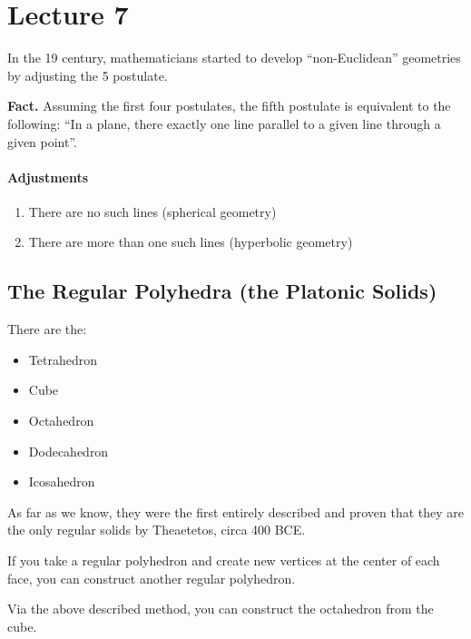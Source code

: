 \documentclass[class=article, crop=false]{standalone}
\begin{document}
  \section{Lecture 7}
  In the 19 century, mathematicians started to develop ``non-Euclidean'' geometries by adjusting the 5 postulate. \par
  \textbf{Fact.} Assuming the first four postulates, the fifth postulate is equivalent to the following: ``In a plane, there exactly one line parallel to a given line through a given point''.
  \paragraph{Adjustments}
  \begin{enumerate}[label=\arabic*)]
    \item There are no such lines (spherical geometry)
    \item There are more than one such lines (hyperbolic geometry)
  \end{enumerate}
  \subsection{The Regular Polyhedra (the Platonic Solids)}
  There are the:
  \begin{itemize}
    \item Tetrahedron
    \item Cube
    \item Octahedron
    \item Dodecahedron
    \item Icosahedron
  \end{itemize}
  As far as we know, they were the first entirely described and proven that they are the only regular solids by Theaetetos, circa 400 BCE.
  \begin{note}{}
    If you take a regular polyhedron and create new vertices at the center of each face, you can construct another regular polyhedron.
  \end{note}
  Via the above described method, you can construct the octahedron from the cube.
\end{document}
